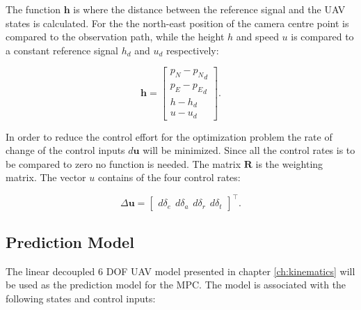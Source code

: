 The function $\mathbf{h}$ is where the distance between the reference signal and the UAV states is calculated. For the the north-east position of the camera centre point is compared to the observation path, while the height $h$ and speed $u$ is compared to a constant reference signal $h_d$ and $u_d$ respectively:

\begin{equation}
	\mathbf{h} =
	\begin{bmatrix}
		p_N - {p_N}_d \\
		p_E - {p_E}_d \\
		h - h_d \\
		u - u_d
	\end{bmatrix}.
\end{equation}

In order to reduce the control effort for the optimization problem the rate of change of the control inputs $d\mathbf{u}$ will be minimized. Since all the control rates is to be compared to zero no function is needed. The matrix $\mathbf{R}$ is the weighting matrix. The vector $u$ contains of the four control rates:

\begin{equation}
	\label{eq:control_rates}
	\Delta\mathbf{u} = 
	\begin{bmatrix}
		d\delta_e \hspace{5pt} d\delta_a \hspace{5pt} d\delta_r \hspace{5pt} d\delta_t
	\end{bmatrix} ^\intercal .
\end{equation}


\subsection{Prediction Model}

The linear decoupled 6 DOF UAV model presented in chapter \ref{ch:kinematics} will be used as the prediction model for the MPC. The model is associated with the following states and control inputs:

